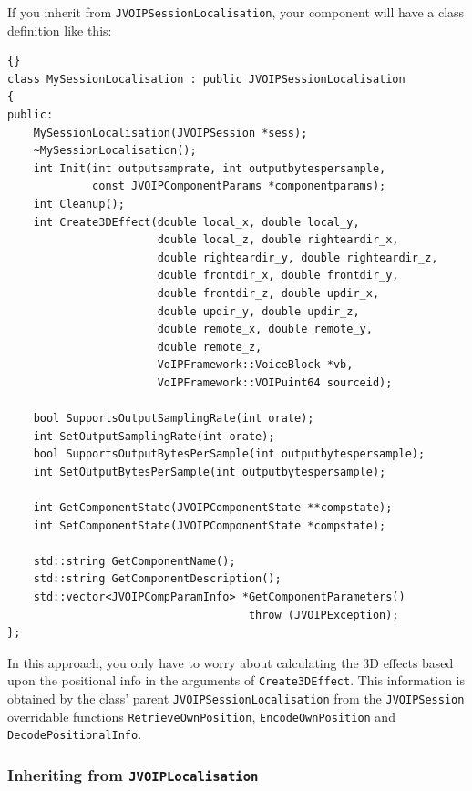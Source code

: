 			If you inherit from {\tt JVOIPSessionLocalisation}, your component will have
			a class definition like this:
			\begin{lstlisting}[frame=tb]{}
class MySessionLocalisation : public JVOIPSessionLocalisation
{
public:
	MySessionLocalisation(JVOIPSession *sess);
	~MySessionLocalisation();
	int Init(int outputsamprate, int outputbytespersample, 
	         const JVOIPComponentParams *componentparams);
	int Cleanup();
	int Create3DEffect(double local_x, double local_y, 
	                   double local_z, double righteardir_x,
	                   double righteardir_y, double righteardir_z,
					   double frontdir_x, double frontdir_y,
					   double frontdir_z, double updir_x,
					   double updir_y, double updir_z,
	                   double remote_x, double remote_y, 
	                   double remote_z,
	                   VoIPFramework::VoiceBlock *vb,
	                   VoIPFramework::VOIPuint64 sourceid);
	
	bool SupportsOutputSamplingRate(int orate);
	int SetOutputSamplingRate(int orate);
	bool SupportsOutputBytesPerSample(int outputbytespersample);
	int SetOutputBytesPerSample(int outputbytespersample);
	
	int GetComponentState(JVOIPComponentState **compstate);
	int SetComponentState(JVOIPComponentState *compstate);
	
	std::string GetComponentName();
	std::string GetComponentDescription();
	std::vector<JVOIPCompParamInfo> *GetComponentParameters() 
	                                 throw (JVOIPException);
};
			\end{lstlisting}
			
			In this approach, you only have to worry about calculating the 3D effects based
			upon the positional info in the arguments of {\tt Create3DEffect}. This 
			information is obtained by the class' parent {\tt JVOIPSessionLocalisation} from
			the {\tt JVOIPSession} overridable functions {\tt RetrieveOwnPosition}, 
			{\tt EncodeOwnPosition} and {\tt DecodePositionalInfo}.
			
			\subsubsection{Inheriting from {\tt JVOIPLocalisation}}
			
